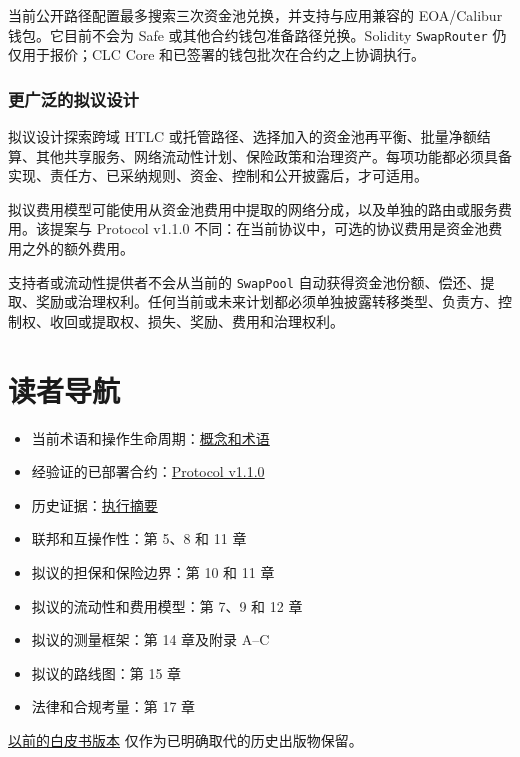 \documentclass[11pt]{article}
\begin{document}
当前公开路径配置最多搜索三次资金池兑换，并支持与应用兼容的 EOA/Calibur 钱包。它目前不会为 Safe 或其他合约钱包准备路径兑换。Solidity \texttt{SwapRouter} 仍仅用于报价；CLC Core 和已签署的钱包批次在合约之上协调执行。

\subsubsection*{更广泛的拟议设计}

拟议设计探索跨域 HTLC 或托管路径、选择加入的资金池再平衡、批量净额结算、其他共享服务、网络流动性计划、保险政策和治理资产。每项功能都必须具备实现、责任方、已采纳规则、资金、控制和公开披露后，才可适用。

拟议费用模型可能使用从资金池费用中提取的网络分成，以及单独的路由或服务费用。该提案与 Protocol v1.1.0 不同：在当前协议中，可选的协议费用是资金池费用之外的额外费用。

支持者或流动性提供者不会从当前的 \texttt{SwapPool} 自动获得资金池份额、偿还、提取、奖励或治理权利。任何当前或未来计划都必须单独披露转移类型、负责方、控制权、收回或提取权、损失、奖励、费用和治理权利。

\section*{读者导航}

\begin{itemize}[leftmargin=*]
\item 当前术语和操作生命周期：\href{https://docs.cosmolocal.credit/zh/introduction/concepts}{概念和术语}
\item 经验证的已部署合约：\href{https://docs.cosmolocal.credit/zh/protocol/overview}{Protocol v1.1.0}
\item 历史证据：\href{https://docs.cosmolocal.credit/zh/white-paper/executive-summary}{执行摘要}
\item 联邦和互操作性：第 5、8 和 11 章
\item 拟议的担保和保险边界：第 10 和 11 章
\item 拟议的流动性和费用模型：第 7、9 和 12 章
\item 拟议的测量框架：第 14 章及附录 A--C
\item 拟议的路线图：第 15 章
\item 法律和合规考量：第 17 章
\end{itemize}
\href{https://docs.cosmolocal.credit/zh/white-paper/archive}{以前的白皮书版本} 仅作为已明确取代的历史出版物保留。
\end{document}
